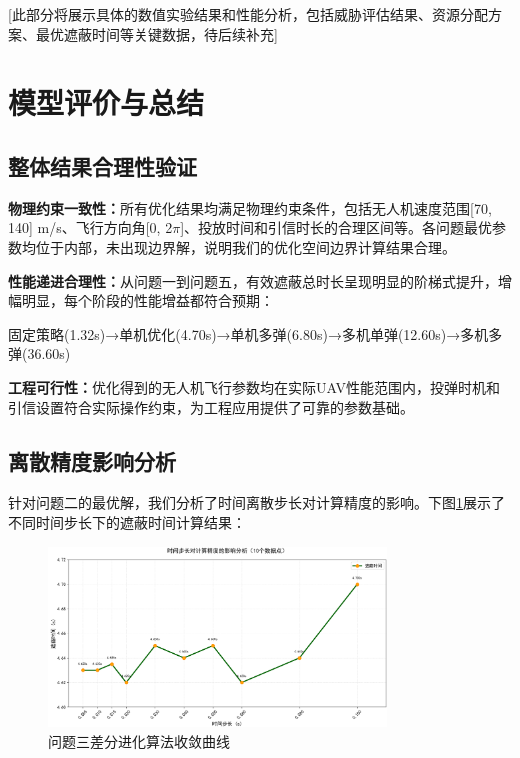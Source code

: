 \documentclass[fontset=SimSun]{ctexart}
\begin{document}
[此部分将展示具体的数值实验结果和性能分析，包括威胁评估结果、资源分配方案、最优遮蔽时间等关键数据，待后续补充]

\section{模型评价与总结}

\subsection{整体结果合理性验证}

\textbf{物理约束一致性：}所有优化结果均满足物理约束条件，包括无人机速度范围[70, 140] m/s、飞行方向角[0, 2$\pi$]、投放时间和引信时长的合理区间等。各问题最优参数均位于内部，未出现边界解，说明我们的优化空间边界计算结果合理。

\textbf{性能递进合理性：}从问题一到问题五，有效遮蔽总时长呈现明显的阶梯式提升，增幅明显，每个阶段的性能增益都符合预期：

\noindent 固定策略(1.32s)→单机优化(4.70s)→单机多弹(6.80s)→多机单弹(12.60s)→多机多弹(36.60s)

\textbf{工程可行性：}优化得到的无人机飞行参数均在实际UAV性能范围内，投弹时机和引信设置符合实际操作约束，为工程应用提供了可靠的参数基础。

\subsection{离散精度影响分析}

针对问题二的最优解，我们分析了时间离散步长对计算精度的影响。下图\ref{步长-遮蔽时间-题2}展示了不同时间步长下的遮蔽时间计算结果：

\begin{figure}[H]
    \centering
    \includegraphics[width=0.8\textwidth]{10.不同时间步长对最终遮蔽时间-问题2.png}
    \caption{问题三差分进化算法收敛曲线}
    \label{步长-遮蔽时间-题2}
\end{figure}
\end{document}
